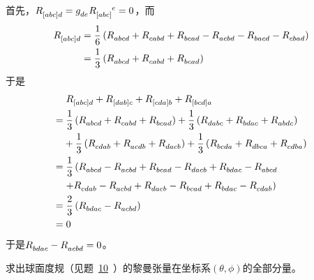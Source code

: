 \begin{xiti}
	\begin{zm}
		首先，$\tensor{R}{_{[abc]}_d}= \tensor{g}{_d_e} \tensor{R}{_{[abc]}^e} =0 $，而
		\begin{align*}
		\tensor{R}{_{[abc]}_d}&=\frac{1}{6} \left( \tensor{R}{_a_b_c_d}+ \tensor{R}{_c_a_b_d}+ \tensor{R}{_b_c_a_d}- \tensor{R}{_a_c_b_d}- \tensor{R}{_b_a_c_d}- \tensor{R}{_c_b_a_d} \right)\\
		&=\frac{1}{3} \left( \tensor{R}{_a_b_c_d}+ \tensor{R}{_c_a_b_d}+ \tensor{R}{_b_c_a_d} \right)
		\end{align*}
		于是
		\begin{align*}
		&\;\tensor{R}{_{[abc]}_d} + \tensor{R}{_{[dab]c}} + \tensor{R}{_{[cda]b}} + \tensor{R}{_{[bcd]a}}\\
		=&\; \frac{1}{3} \left( \tensor{R}{_a_b_c_d}+ \tensor{R}{_c_a_b_d}+ \tensor{R}{_b_c_a_d} \right)+\frac{1}{3} \left( \tensor{R}{_d_a_b_c}+ \tensor{R}{_b_d_a_c}+ \tensor{R}{_a_b_d_c} \right)\\
		&+\frac{1}{3} \left( \tensor{R}{_c_d_a_b}+ \tensor{R}{_a_c_d_b}+ \tensor{R}{_d_a_c_b} \right)+\frac{1}{3} \left( \tensor{R}{_b_c_d_a}+ \tensor{R}{_d_b_c_a}+ \tensor{R}{_c_d_b_a} \right) \\
		=&\; \frac{1}{3} \left( \tensor{R}{_a_b_c_d}- \tensor{R}{_a_c_b_d}+ \tensor{R}{_b_c_a_d}- \tensor{R}{_d_a_c_b}+ \tensor{R}{_b_d_a_c}- \tensor{R}{_a_b_c_d}\right.\\
		&\left.+\tensor{R}{_c_d_a_b}- \tensor{R}{_a_c_b_d}+ \tensor{R}{_d_a_c_b}- \tensor{R}{_b_c_a_d}+ \tensor{R}{_b_d_a_c}- \tensor{R}{_c_d_a_b} \right)\\
		=&\; \frac{2}{3} \left( \tensor{R}{_b_d_a_c}- \tensor{R}{_a_c_b_d} \right)\\
		=&\;0
		\end{align*}
		于是$\tensor{R}{_b_d_a_c}- \tensor{R}{_a_c_b_d}=0$。
	\end{zm}

	\item \hypertarget{2.13}{}求出球面度规（见题~\hyperlink{2.10}{10}~）的黎曼张量在坐标系$(\theta,\phi)$的全部分量。


\end{xiti}
